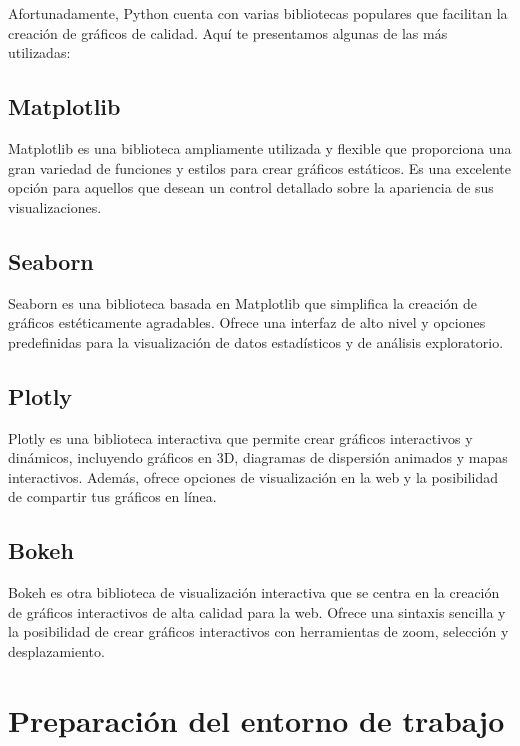\documentclass[
  a4paper,
]{article}
\begin{document}
Afortunadamente, Python cuenta con varias bibliotecas populares que
facilitan la creación de gráficos de calidad. Aquí te presentamos
algunas de las más utilizadas:

\hypertarget{matplotlib}{%
\subsection{Matplotlib}\label{matplotlib}}

Matplotlib es una biblioteca ampliamente utilizada y flexible que
proporciona una gran variedad de funciones y estilos para crear gráficos
estáticos. Es una excelente opción para aquellos que desean un control
detallado sobre la apariencia de sus visualizaciones.

\hypertarget{seaborn}{%
\subsection{Seaborn}\label{seaborn}}

Seaborn es una biblioteca basada en Matplotlib que simplifica la
creación de gráficos estéticamente agradables. Ofrece una interfaz de
alto nivel y opciones predefinidas para la visualización de datos
estadísticos y de análisis exploratorio.

\hypertarget{plotly}{%
\subsection{Plotly}\label{plotly}}

Plotly es una biblioteca interactiva que permite crear gráficos
interactivos y dinámicos, incluyendo gráficos en 3D, diagramas de
dispersión animados y mapas interactivos. Además, ofrece opciones de
visualización en la web y la posibilidad de compartir tus gráficos en
línea.

\hypertarget{bokeh}{%
\subsection{Bokeh}\label{bokeh}}

Bokeh es otra biblioteca de visualización interactiva que se centra en
la creación de gráficos interactivos de alta calidad para la web. Ofrece
una sintaxis sencilla y la posibilidad de crear gráficos interactivos
con herramientas de zoom, selección y desplazamiento.

\hypertarget{preparaciuxf3n-del-entorno-de-trabajo}{%
\section{Preparación del entorno de
trabajo}\label{preparaciuxf3n-del-entorno-de-trabajo}}
\end{document}
